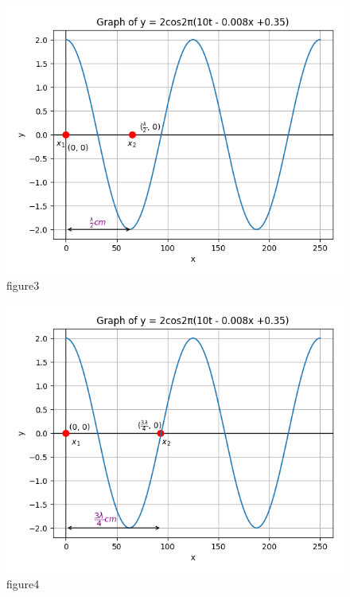 \documentclass[journal,12pt,twocolumn]{IEEEtran}
\theoremstyle{remark}
\begin{document}
\begin{figure}[!h] 
\centering
\includegraphics[width=\linewidth]{figs/graph_3.png}
\captionsetup{justification=centering}
\caption{figure3}
\label{Solution}
\end{figure}


\begin{figure}[!h] 
\centering
\includegraphics[width=\linewidth]{figs/graph_4.png}
\captionsetup{justification=centering}
\caption{figure4}
\label{Solution}
\end{figure}
\end{document}
